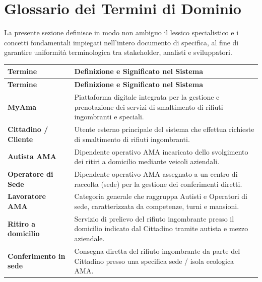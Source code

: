 \section{Glossario dei Termini di Dominio}

La presente sezione definisce in modo non ambiguo il lessico specialistico e i concetti fondamentali impiegati nell'intero documento di specifica, al fine di garantire uniformità terminologica tra stakeholder, analisti e sviluppatori.

\begin{center}
\renewcommand{\arraystretch}{1.3}
\begin{longtable}{|p{4.2cm}|p{11.2cm}|}
\hline
\rowcolor{tableheader} \textbf{Termine} & \textbf{Definizione e Significato nel Sistema} \\ \hline
\endfirsthead

\hline
\rowcolor{tableheader} \textbf{Termine} & \textbf{Definizione e Significato nel Sistema} \\ \hline
\endhead

\textbf{MyAma} & Piattaforma digitale integrata per la gestione e prenotazione dei servizi di smaltimento di rifiuti ingombranti e speciali. \\ \hline

\textbf{Cittadino / Cliente} & Utente esterno principale del sistema che effettua richieste di smaltimento di rifiuti ingombranti. \\ \hline

\textbf{Autista AMA} & Dipendente operativo AMA incaricato dello svolgimento dei ritiri a domicilio mediante veicoli aziendali. \\ \hline

\textbf{Operatore di Sede} & Dipendente operativo AMA assegnato a un centro di raccolta (sede) per la gestione dei conferimenti diretti. \\ \hline

\textbf{Lavoratore AMA} & Categoria generale che raggruppa Autisti e Operatori di sede, caratterizzata da competenze, turni e mansioni. \\ \hline

\textbf{Ritiro a domicilio} & Servizio di prelievo del rifiuto ingombrante presso il domicilio indicato dal Cittadino tramite autista e mezzo aziendale. \\ \hline

\textbf{Conferimento in sede} & Consegna diretta del rifiuto ingombrante da parte del Cittadino presso una specifica sede / isola ecologica AMA. \\ \hline


\end{longtable}
\end{center}

